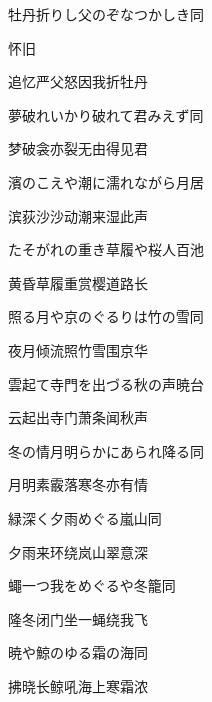 \begin{haiku}
    {\FH 牡丹折りし父のぞなつかしき}\hfill{\FH 同}

    {\FK 怀旧}

    {\FK 追忆严父怒因我折牡丹}
\end{haiku}

\begin{haiku}
    {\FH 夢破れいかり破れて君みえず}\hfill{\FH 同}

    {\FK 梦破衾亦裂无由得见君}
\end{haiku}

\begin{haiku}
    {\FH 濱のこえや潮に濡れながら}\hfill{\FH 月居}

    {\FK 滨荻沙沙动潮来湿此声}
\end{haiku}

\begin{haiku}
    {\FH たそがれの重き草履や桜人}\hfill{\FH 百池}

    {\FK 黄昏草履重赏樱道路长}
\end{haiku}

\begin{haiku}
    {\FH 照る月や京のぐるりは竹の雪}\hfill{\FH 同}

    {\FK 夜月倾流照竹雪围京华}
\end{haiku}

\begin{haiku}
    {\FH 雲起て寺門を出づる秋の声}\hfill{\FH 暁台}

    {\FK 云起出寺门萧条闻秋声}
\end{haiku}

\begin{haiku}
    {\FH 冬の情月明らかにあられ降る}\hfill{\FH 同}

    {\FK 月明素霰落寒冬亦有情}
\end{haiku}

\begin{haiku}
    {\FH 緑深く夕雨めぐる嵐山}\hfill{\FH 同}

    {\FK 夕雨来环绕岚山翠意深}
\end{haiku}

\begin{haiku}
    {\FH 蠅一つ我をめぐるや冬籠}\hfill{\FH 同}

    {\FK 隆冬闭门坐一蝇绕我飞}
\end{haiku}

\begin{haiku}
    {\FH 暁や鯨のゆる霜の海}\hfill{\FH 同}

    {\FK 拂晓长鲸吼海上寒霜浓}
\end{haiku}

